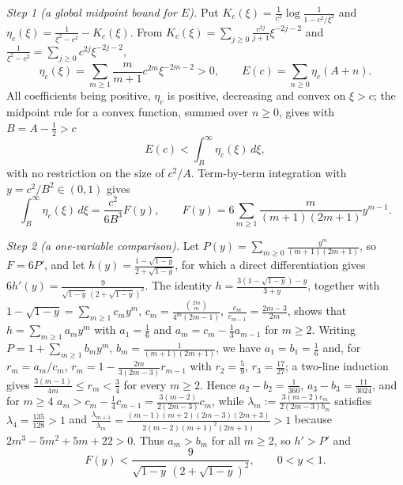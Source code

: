 \documentclass[11pt,a4paper]{amsart}
\theoremstyle{definition}
\begin{document}
\emph{Step 1 (a global midpoint bound for $E$).} Put
$K_c(\xi)=\frac{1}{c^{2}}\log\frac{1}{1-c^{2}/\xi^{2}}$ and
$\eta_c(\xi)=\frac{1}{\xi^{2}-c^{2}}-K_c(\xi)$. From
$K_c(\xi)=\sum_{j\ge0}\frac{c^{2j}}{j+1}\xi^{-2j-2}$ and
$\frac{1}{\xi^{2}-c^{2}}=\sum_{j\ge0}c^{2j}\xi^{-2j-2}$,
\[
  \eta_c(\xi)=\sum_{m\ge1}\frac{m}{m+1}c^{2m}\xi^{-2m-2}>0,\qquad
  E(c)=\sum_{n\ge0}\eta_c(A+n).
\]
All coefficients being positive, $\eta_c$ is positive, decreasing and convex on $\xi>c$; the
midpoint rule for a convex function, summed over $n\ge0$, gives with $B=A-\frac12>c$
\begin{equation}\label{eq:mid}
  E(c)<\int_{B}^{\infty}\eta_c(\xi)\,d\xi ,
\end{equation}
with no restriction on the size of $c^{2}/A$. Term-by-term integration with
$y=c^{2}/B^{2}\in(0,1)$ gives
\begin{equation}\label{eq:F}
  \int_{B}^{\infty}\eta_c(\xi)\,d\xi=\frac{c^{2}}{6B^{3}}F(y),\qquad
  F(y)=6\sum_{m\ge1}\frac{m}{(m+1)(2m+1)}y^{m-1}.
\end{equation}

\emph{Step 2 (a one-variable comparison).} Let
$P(y)=\sum_{m\ge0}\frac{y^{m}}{(m+1)(2m+1)}$, so $F=6P'$, and let
$h(y)=\frac{1-\sqrt{1-y}}{2+\sqrt{1-y}}$, for which a direct differentiation gives
$6h'(y)=\frac{9}{\sqrt{1-y}\,(2+\sqrt{1-y})^{2}}$. The identity
$h=\frac{3(1-\sqrt{1-y})-y}{3+y}$, together with
$1-\sqrt{1-y}=\sum_{m\ge1}c_my^{m}$,
$c_m=\frac{\binom{2m}{m}}{4^{m}(2m-1)}$, $\frac{c_m}{c_{m-1}}=\frac{2m-3}{2m}$,
shows that $h=\sum_{m\ge1}a_my^{m}$ with $a_1=\frac16$ and
$a_m=c_m-\frac13a_{m-1}$ for $m\ge2$. Writing $P=1+\sum_{m\ge1}b_my^{m}$,
$b_m=\frac{1}{(m+1)(2m+1)}$, we have $a_1=b_1=\frac16$ and, for $r_m=a_m/c_m$,
$r_m=1-\frac{2m}{3(2m-3)}r_{m-1}$ with $r_2=\frac59$, $r_3=\frac{17}{27}$; a two-line
induction gives $\frac{3(m-1)}{4m}\le r_m<\frac34$ for every $m\ge2$. Hence
$a_2-b_2=\frac{1}{360}$, $a_3-b_3=\frac{11}{3024}$, and for $m\ge4$
$a_m>c_m-\frac14c_{m-1}=\frac{3(m-2)}{2(2m-3)}c_m$, while
$\lambda_m:=\frac{3(m-2)c_m}{2(2m-3)b_m}$ satisfies $\lambda_4=\frac{135}{128}>1$ and
$\frac{\lambda_{m+1}}{\lambda_m}=\frac{(m-1)(m+2)(2m-3)(2m+3)}{2(m-2)(m+1)^{2}(2m+1)}>1$
because $2m^{3}-5m^{2}+5m+22>0$. Thus $a_m>b_m$ for all $m\ge2$, so $h'>P'$ and
\begin{equation}\label{eq:sharp1}
  F(y)<\frac{9}{\sqrt{1-y}\,(2+\sqrt{1-y})^{2}},\qquad 0<y<1 .
\end{equation}
\end{document}
